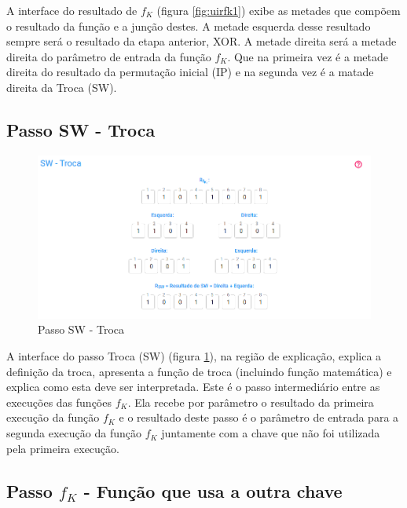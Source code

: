 A interface do resultado de \(f_K\) (figura \ref{fig:uirfk1}) exibe as metades que compõem o resultado da função e a junção destes. A metade esquerda desse resultado sempre será o resultado da etapa anterior, XOR. A metade direita será a metade direita do parâmetro de entrada da função \(f_K\). Que na primeira vez é a metade direita do resultado da permutação inicial (IP) e na segunda vez é a matade direita da Troca (SW).

\subsection{Passo SW - Troca}

\begin{figure}[H]
    \centering
    \caption{Passo SW - Troca}
    \label{fig:uisw}
    \includegraphics[width=1\linewidth]{UI/UISW.png}
\end{figure}

A interface do passo Troca (SW) (figura \ref{fig:uisw}), na região de explicação, explica a definição da troca, apresenta a função de troca (incluindo função matemática) e explica como esta deve ser interpretada. Este é o passo intermediário entre as execuções das funções \(f_K\). Ela recebe por parâmetro o resultado da primeira execução da função \(f_K\) e o resultado deste passo é o parâmetro de entrada para a segunda execução da função \(f_K\) juntamente com a chave que não foi utilizada pela primeira execução.

\subsection{Passo \(f_K\) - Função que usa a outra chave}


